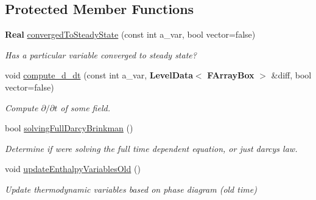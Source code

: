 \subsection*{Protected Member Functions}
\begin{DoxyCompactItemize}
\item 
\mbox{\label{class_a_m_r_level_mushy_layer_aad8e3d2cda90acb68c1086e0e08096a6}} 
\textbf{ Real} \hyperlink{class_a_m_r_level_mushy_layer_aad8e3d2cda90acb68c1086e0e08096a6}{converged\+To\+Steady\+State} (const int a\+\_\+var, bool vector=false)
\begin{DoxyCompactList}\small\item\em Has a particular variable converged to steady state? \end{DoxyCompactList}\item 
\mbox{\label{class_a_m_r_level_mushy_layer_a0f76ac50feba2ebcf8cd431948690a76}} 
void \hyperlink{class_a_m_r_level_mushy_layer_a0f76ac50feba2ebcf8cd431948690a76}{compute\+\_\+d\+\_\+dt} (const int a\+\_\+var, \textbf{ Level\+Data}$<$ \textbf{ F\+Array\+Box} $>$ \&diff, bool vector=false)
\begin{DoxyCompactList}\small\item\em Compute $ \partial / \partial t $ of some field. \end{DoxyCompactList}\item 
\mbox{\label{class_a_m_r_level_mushy_layer_ab86dcb9c77a0696fbb3fbc7d6a1d09b3}} 
bool \hyperlink{class_a_m_r_level_mushy_layer_ab86dcb9c77a0696fbb3fbc7d6a1d09b3}{solving\+Full\+Darcy\+Brinkman} ()
\begin{DoxyCompactList}\small\item\em Determine if we\textquotesingle{}re solving the full time dependent equation, or just darcy\textquotesingle{}s law. \end{DoxyCompactList}\item 
\mbox{\label{class_a_m_r_level_mushy_layer_a540bac726905fcc0af2fcfe7a8b7fed1}} 
void \hyperlink{class_a_m_r_level_mushy_layer_a540bac726905fcc0af2fcfe7a8b7fed1}{update\+Enthalpy\+Variables\+Old} ()
\begin{DoxyCompactList}\small\item\em Update thermodynamic variables based on phase diagram (old time) \end{DoxyCompactList}\item 

\end{DoxyCompactItemize}
